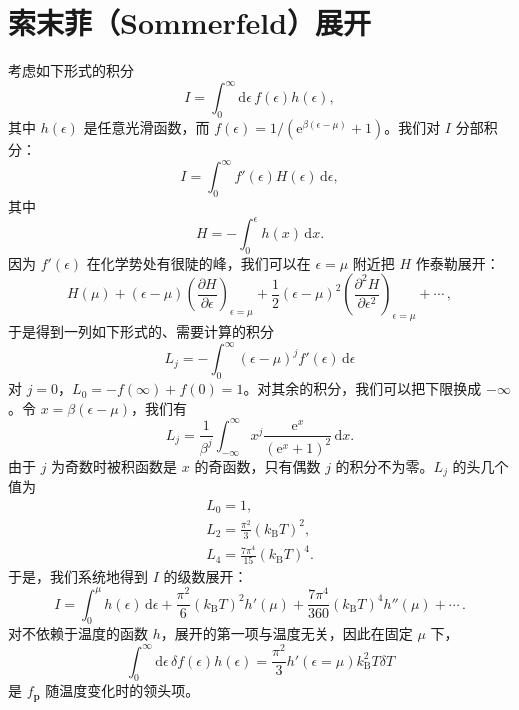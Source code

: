 \section*{索末菲（Sommerfeld）展开}

考虑如下形式的积分
\begin{equation*}
I=\int_{0}^{\infty}\mathrm{d}\epsilon\,f(\epsilon)h(\epsilon),
\tag{2.25}
\end{equation*}
其中 $h(\epsilon)$ 是任意光滑函数，而 $f(\epsilon)=1/(\mathrm{e}^{\beta(\epsilon-\mu)}+1)$。我们对 $I$ 分部积分：
\begin{equation*}
I=\int_{0}^{\infty}f'(\epsilon)H(\epsilon)\,\mathrm{d}\epsilon,
\tag{2.26}
\end{equation*}
其中
\begin{equation*}
H=-\int_{0}^{\epsilon}h(x)\,\mathrm{d}x.
\tag{2.27}
\end{equation*}
因为 $f'(\epsilon)$ 在化学势处有很陡的峰，我们可以在 $\epsilon=\mu$ 附近把 $H$ 作泰勒展开：
\begin{equation*}
H(\mu)+(\epsilon-\mu)\left(\frac{\partial H}{\partial\epsilon}\right)_{\epsilon=\mu}+\frac{1}{2}(\epsilon-\mu)^{2}\left(\frac{\partial^{2}H}{\partial\epsilon^{2}}\right)_{\epsilon=\mu}+\cdots\,,
\tag{2.28}
\end{equation*}
于是得到一列如下形式的、需要计算的积分
\begin{equation*}
L_{j}=-\int_{0}^{\infty}(\epsilon-\mu)^{j}f'(\epsilon)\,\mathrm{d}\epsilon
\tag{2.29}
\end{equation*}
对 $j=0$，$L_{0}=-f(\infty)+f(0)=1$。对其余的积分，我们可以把下限换成 $-\infty$。令 $x=\beta(\epsilon-\mu)$，我们有
\begin{equation*}
L_{j}=\frac{1}{\beta^{j}}\int_{-\infty}^{\infty}x^{j}\frac{\mathrm{e}^{x}}{(\mathrm{e}^{x}+1)^{2}}\,\mathrm{d}x.
\tag{2.30}
\end{equation*}
由于 $j$ 为奇数时被积函数是 $x$ 的奇函数，只有偶数 $j$ 的积分不为零。$L_{j}$ 的头几个值为
\begin{gather*}
L_{0}=1,
\tag{2.31}\\
L_{2}=\frac{\pi^{2}}{3}(k_{\mathrm{B}}T)^{2},
\tag{2.32}\\
L_{4}=\frac{7\pi^{4}}{15}(k_{\mathrm{B}}T)^{4}.
\tag{2.33}
\end{gather*}
于是，我们系统地得到 $I$ 的级数展开：
\begin{equation*}
I=\int_{0}^{\mu}h(\epsilon)\,\mathrm{d}\epsilon+\frac{\pi^{2}}{6}(k_{\mathrm{B}}T)^{2}h'(\mu)+\frac{7\pi^{4}}{360}(k_{\mathrm{B}}T)^{4}h''(\mu)+\cdots\,.
\tag{2.34}
\end{equation*}
对不依赖于温度的函数 $h$，展开的第一项与温度无关，因此在固定 $\mu$ 下，
\begin{equation*}
\int_{0}^{\infty}\mathrm{d}\epsilon\,\delta f(\epsilon)h(\epsilon)=\frac{\pi^{2}}{3}h'(\epsilon=\mu)k_{\mathrm{B}}^{2}T\delta T
\tag{2.35}
\end{equation*}
是 $f_{\mathbf{p}}$ 随温度变化时的领头项。

